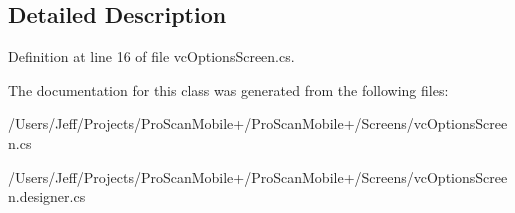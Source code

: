 \subsection{Detailed Description}


Definition at line 16 of file vc\-Options\-Screen.\-cs.



The documentation for this class was generated from the following files\-:\begin{DoxyCompactItemize}
\item 
/\-Users/\-Jeff/\-Projects/\-Pro\-Scan\-Mobile+/\-Pro\-Scan\-Mobile+/\-Screens/vc\-Options\-Screen.\-cs\item 
/\-Users/\-Jeff/\-Projects/\-Pro\-Scan\-Mobile+/\-Pro\-Scan\-Mobile+/\-Screens/vc\-Options\-Screen.\-designer.\-cs\end{DoxyCompactItemize}
